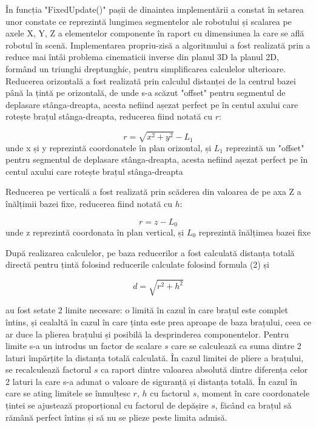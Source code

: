 În funcția "FixedUpdate()" pașii de dinaintea implementării a constat în setarea unor constate ce reprezintă lungimea segmentelor ale robotului și scalarea pe axele X, Y, Z a elementelor componente în raport cu dimensiunea la care se află robotul în scenă. Implementarea propriu-zisă a algoritmului a fost realizată prin a reduce mai întâi problema cinematicii inverse din planul 3D la planul 2D, formând un triunghi dreptunghic, pentru simplificarea calculelor ulterioare. Reducerea orizontală a fost realizată prin calculul distanței de la centrul bazei până la țintă pe orizontală, de unde s-a scăzut "offset" pentru segmentul de deplasare stânga-dreapta, acesta nefiind așezat perfect pe în centul axului care rotește brațul stânga-dreapta, reducerea fiind notată cu $r$:


	\begin{equation}
	r = \sqrt{x^2 + y^2} - L_1
	\end{equation}
	unde x și y reprezintă coordonatele în plan orizontal, și $L_1$ reprezintă un "offset" pentru segmentul de deplasare stânga-dreapta, acesta nefiind așezat perfect pe în centul axului care rotește brațul stânga-dreapta



Reducerea pe verticală a fost realizată prin scăderea din valoarea de pe axa Z a  înălțimii bazei fixe, reducerea fiind notată cu $h$:

	\begin{equation}
	r = z - L_0
\end{equation}
unde z reprezintă coordonata în plan vertical, și $L_0$ reprezintă înălțimea bazei fixe



După realizarea calculelor, pe baza reducerilor a fost calculată distanța totală directă pentru țintă folosind reducerile calculate folosind formula (2) și

	\begin{equation}
	d = \sqrt{r^2 + h^2}
\end{equation}

au fost setate 2 limite necesare: o limită în cazul în care brațul este complet întins, și cealaltă în cazul în care ținta este prea aproape de baza brațului, ceea ce ar duce la plierea brațului și posibilă la desprinderea componentelor. 
Pentru limite s-a un introdus un factor de scalare $s$ care se calculează ca suma dintre 2 laturi împărțite la distanța totală calculată.
În cazul limitei de pliere a brațului, se recalculează factorul $s$ ca raport dintre valoarea absolută dintre diferența celor 2 laturi la care s-a adunat o valoare de siguranță și distanța totală. 
În cazul în care se ating limitele se înmulțesc $r$, $h$ cu factorul $s$, moment în care coordonatele țintei se ajustează proporțional cu factorul de depășire $s$, făcând ca brațul să rămână perfect întins și să nu se plieze peste limita admisă. 

